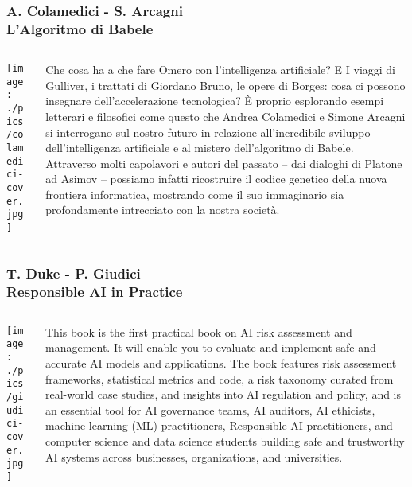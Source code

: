 \documentclass[aspectratio=169]{beamer}
\begin{document}
%
%
\begin{frame}
\frametitle{\small A. Colamedici - S. Arcagni  \\ \normalsize \textbf{L'Algoritmo di Babele}}
\begin{columns}[c]
\begin{column}{0.35\textwidth}
    \centering
    \texttt{[image: ./pics/colamedici-cover.jpg]}
\end{column}
\begin{column}{0.6\textwidth}
    {\small
Che cosa ha a che fare Omero con l’intelligenza artificiale? E I viaggi di Gulliver, i trattati di Giordano Bruno, le opere di Borges: cosa ci possono insegnare dell’accelerazione tecnologica?  È proprio esplorando esempi letterari e filosofici come questo che Andrea Colamedici e Simone Arcagni si interrogano sul nostro futuro in relazione all’incredibile sviluppo dell’intelligenza artificiale e al mistero dell’algoritmo di Babele. Attraverso molti capolavori e autori del passato – dai dialoghi di Platone ad Asimov – possiamo infatti ricostruire il codice genetico della nuova frontiera informatica, mostrando come il suo immaginario sia profondamente intrecciato con la nostra società. 
}
\end{column}
\end{columns}
\end{frame}
%
%
\begin{frame}
\frametitle{\small T. Duke - P. Giudici  \\ \normalsize \textbf{Responsible AI in Practice}}
\begin{columns}[c]
\begin{column}{0.35\textwidth}
    \centering
    \texttt{[image: ./pics/giudici-cover.jpg]}
\end{column}
\begin{column}{0.6\textwidth}
    {\small
This book is the first practical book on AI risk assessment and management. It will enable you to evaluate and implement safe and accurate AI models and applications. The book features risk assessment frameworks, statistical metrics and code, a risk taxonomy curated from real-world case studies, and insights into AI regulation and policy, and is an essential tool for AI governance teams, AI auditors, AI ethicists, machine learning (ML) practitioners, Responsible AI practitioners, and computer science and data science students building safe and trustworthy AI systems across businesses, organizations, and universities.
}
\end{column}
\end{columns}
\end{frame}
%
%
\end{document}
